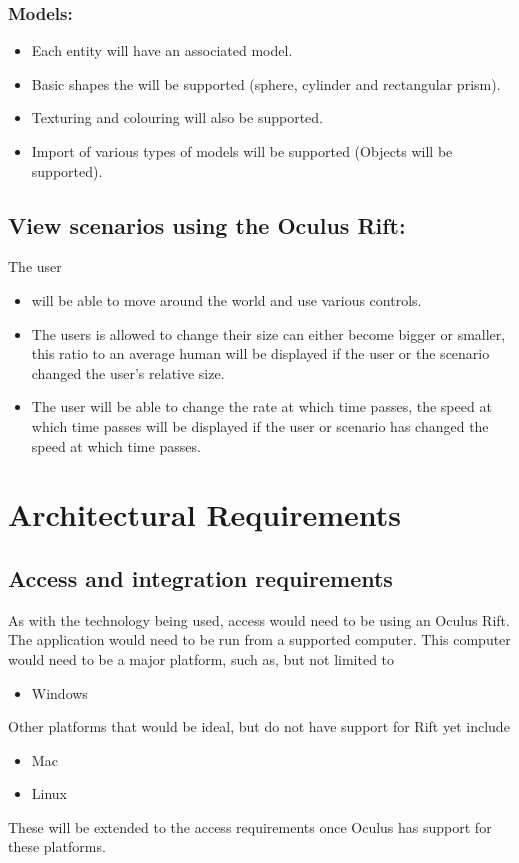 \documentclass[a4paper,12pt]{article}
\begin{document}
\subsubsection{Models:} 
\begin{itemize}
	\item Each entity will have an associated model. 
	\item Basic shapes the will be supported (sphere, cylinder and rectangular prism).
	\item Texturing and colouring will also be supported. 
	\item Import of various types of models will be supported (Objects will be supported).
\end{itemize}

\subsection{View scenarios using the Oculus Rift:}
The user 
\begin{itemize}
	\item will be able to move around the world and use various controls. 
	\item The users is allowed to change their size can either become bigger or smaller, this ratio to an average human will be displayed if the user or the scenario changed the user's relative size. 
	\item The user will be able to change the rate at which time passes, the speed at which time passes will be displayed if the user or scenario has changed the speed at which time passes.
\end{itemize}



\newpage
\section{Architectural Requirements}	%

\subsection{Access and integration requirements}
As with the technology being used, access would need to be using an Oculus Rift. \newline\newline The application would need to be run from a supported computer. This computer would need to be a major platform, such as, but not limited to
\begin{itemize}
	\item Windows
\end{itemize}
Other platforms that would be ideal, but do not have support for Rift yet include
\begin{itemize}
	\item Mac
	\item Linux
\end{itemize}
These will be extended to the access requirements once Oculus has support for these platforms.
\end{document}
